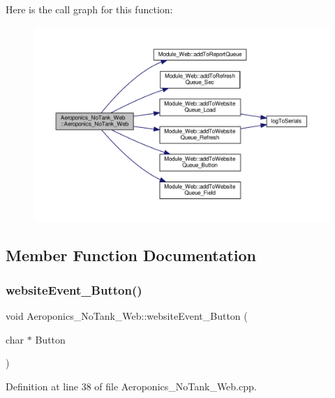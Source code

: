 Here is the call graph for this function\+:
\nopagebreak
\begin{figure}[H]
\begin{center}
\leavevmode
\includegraphics[width=350pt]{class_aeroponics___no_tank___web_a5808702849b83477f93202b05b170e2b_cgraph}
\end{center}
\end{figure}


\subsection{Member Function Documentation}
\mbox{\label{class_aeroponics___no_tank___web_a33b388e724f870482f90106fdacaa3b4}} 
\subsubsection{\texorpdfstring{website\+Event\+\_\+\+Button()}{websiteEvent\_Button()}}
{\footnotesize\ttfamily void Aeroponics\+\_\+\+No\+Tank\+\_\+\+Web\+::website\+Event\+\_\+\+Button (\begin{DoxyParamCaption}\item[{char $\ast$}]{Button }\end{DoxyParamCaption})}



Definition at line 38 of file Aeroponics\+\_\+\+No\+Tank\+\_\+\+Web.\+cpp.

